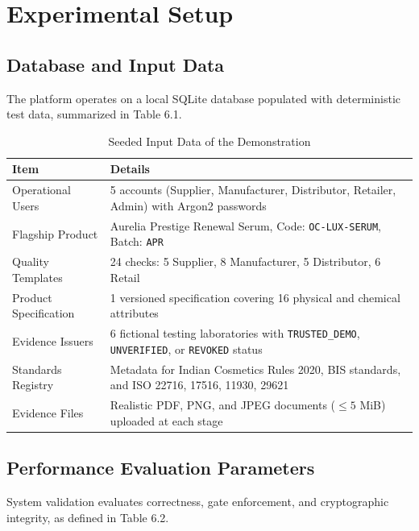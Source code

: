 \documentclass[12pt,a4paper]{report}
\begin{document}
\chapter{Experimental Setup}

\section{Database and Input Data}
The platform operates on a local SQLite database populated with deterministic test data, summarized in Table 6.1.

\begin{table}[H]
\centering
\caption{Seeded Input Data of the Demonstration}
\label{tab:seed_data}
\small
\renewcommand{\arraystretch}{1.22}
\begin{tabularx}{\textwidth}{L{4.2cm} Y}
\toprule
\textbf{Item} & \textbf{Details} \\
\midrule
Operational Users & 5 accounts (Supplier, Manufacturer, Distributor, Retailer, Admin) with Argon2 passwords \\
Flagship Product & Aurelia Prestige Renewal Serum, Code: \texttt{OC\allowbreak-LUX\allowbreak-SERUM}, Batch: \texttt{APR} \\
Quality Templates & 24 checks: 5 Supplier, 8 Manufacturer, 5 Distributor, 6 Retail \\
Product Specification & 1 versioned specification covering 16 physical and chemical attributes \\
Evidence Issuers & 6 fictional testing laboratories with \texttt{TRUSTED\_DEMO}, \texttt{UNVERIFIED}, or \texttt{REVOKED} status \\
Standards Registry & Metadata for Indian Cosmetics Rules 2020, BIS standards, and ISO 22716, 17516, 11930, 29621 \\
Evidence Files & Realistic PDF, PNG, and JPEG documents ($\le 5$ MiB) uploaded at each stage \\
\bottomrule
\end{tabularx}
\end{table}

\section{Performance Evaluation Parameters}
System validation evaluates correctness, gate enforcement, and cryptographic integrity, as defined in Table 6.2.
\end{document}

